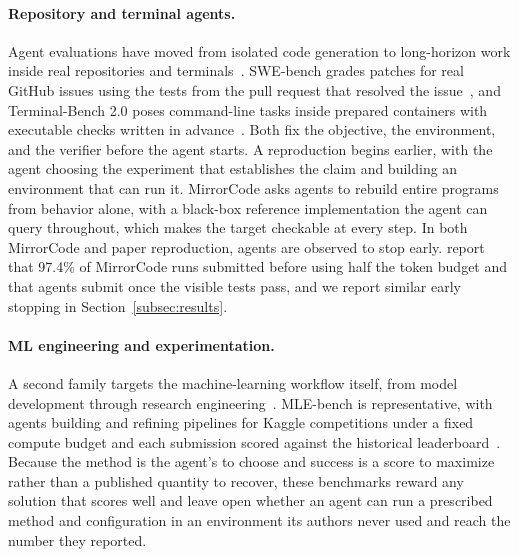 \documentclass{article} %
\begin{document}
\paragraph{Repository and terminal agents.}
Agent evaluations have moved from isolated code generation to long-horizon
work inside real repositories and terminals~\citep{miserendino2025swelancer,deng2025swebenchpro,
lu2026frontiercode,tang2024mlbench,kwa2025long}. SWE-bench grades patches for
real GitHub issues using
the tests from the pull request that resolved the issue~\citep{jimenez2024swebench}, and
Terminal-Bench 2.0 poses command-line tasks inside prepared containers with
executable checks written in advance~\citep{merrill2026terminalbench}. Both
fix the objective, the environment, and the verifier before the agent
starts. A reproduction begins earlier, with the agent choosing the
experiment that establishes the claim and building an environment that can
run it. MirrorCode asks agents to rebuild entire programs from behavior
alone, with a black-box reference implementation the agent can query
throughout, which makes the target checkable at every step. In both MirrorCode and paper
reproduction, agents are observed to stop early. \citet{adamczewski2026mirrorcode} report
that 97.4\% of MirrorCode runs submitted before using half the token budget and
that agents submit once the visible tests pass, and we report similar early
stopping in Section~\ref{subsec:results}.

\paragraph{ML engineering and experimentation.}
A second family targets the machine-learning workflow itself, from model
development through research engineering~\citep{huang2024mlagentbench,
nathani2025mlgym,jing2025dsbench,zhang2025datascibench,
wijk2024rebench,zhang2025mlrcbench,lupidi2026airsbench,xu2026autolab,rank2026posttrainbench}. MLE-bench is
representative, with agents building and refining pipelines for Kaggle
competitions under a fixed compute budget and each submission scored
against the historical leaderboard~\citep{chan2024mlebench}. Because the method is the agent's to
choose and success is a score to maximize rather than a
published quantity to recover, these benchmarks reward any solution that scores well
and leave open whether an agent can run a prescribed method and
configuration in an environment its authors never used and reach the
number they reported.
\end{document}
